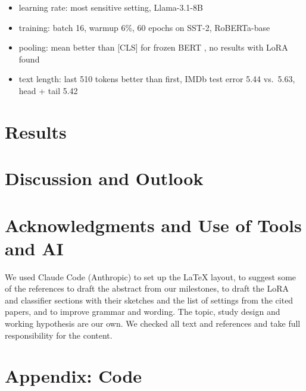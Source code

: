 \documentclass[conference]{IEEEtran}  %
\newcommand{\new}[1]{\textcolor{newgreen}{#1}}  %
\theoremstyle{plain}
\theoremstyle{definition}
\theoremstyle{remark}
\begin{document}
\begin{itemize}
  \item \new{learning rate: most sensitive setting, Llama-3.1-8B \cite{he2026unified}}
  \item \new{training: batch 16, warmup 6\%, 60 epochs on SST-2, RoBERTa-base \cite[Tab.~9]{hu2022lora}}
  \item \new{pooling: mean better than [CLS] for frozen BERT \cite[Tab.~1]{ma2019universal}, no results with LoRA found}
  \item \new{text length: last 510 tokens better than first, IMDb test error 5.44 vs.\ 5.63, head + tail 5.42 \cite[Tab.~2]{sun2019finetune}}
\end{itemize}

\section{Results}
\label{sec:results}

\section{Discussion and Outlook}
\label{sec:discussion}

\section*{Acknowledgments and Use of Tools and AI}
We used Claude Code (Anthropic) to set up the LaTeX layout, to suggest some of the references to draft the abstract from our milestones, \new{to draft the LoRA and classifier sections with their sketches and the list of settings from the cited papers,} and to improve grammar and wording.
The topic, study design and working hypothesis are our own.
We checked all text and references and take full responsibility for the content.

\nocite{devlin2019bert,hu2022lora,sun2019finetune,dodge2020finetuning,socher2013sst,wang2019glue,zhang2015charcnn,lang1995newsweeder}

\clearpage



\section*{Appendix: Code}
\end{document}
